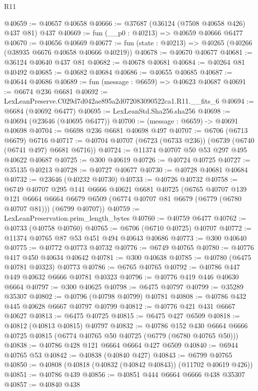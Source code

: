\begin{lexlean}{R11}
\begin{coremodule}
@40659 := @40657 @40658
@40666 := @37687 (@36124 (@7508 @40658 @426) @437 @81) @437
@40669 := fun (__p0 : @40213) => @40659 @40666 @6477
@40670 := @40656 @40669
@40677 := fun (state : @40213) => @40265 (@40266 (@38935 @6676 @40658 @40666 @40219))
@40678 := @40670 @40677
@40681 := @36124 @40640 @437 @81
@40682 := @40678 @40681
@40684 := @40264 @81 @40492
@40685 := @40682 @40684
@40686 := @40655 @40685
@40687 := @40644 @40686
@40689 := fun (message : @6659) => @40623 @40687
@40691 := @6674 @236 @6681
@40692 := LexLeanPreserve.C029d7d042ae895a2d072083090522ca1.R11.__fits_6
@40694 := @6684 (@40692 @6477)
@40695 := LexLeanStd.Sha256.sha256
@40698 := @40694 (@23646 (@40695 @6477))
@40700 := (message : @6659) -> @40691 @40698
@40704 := @6698 @236 @6681 @40698 @497
@40707 := @6706 (@6713 @6679) @6716
@40717 := @40704 @40707 (@6723 (@6733 @236)) (@6739 (@6740 (@6741 @497) @6681 @6716))
@40724 := @11374 @40707 @50 @53 @297 @495 @40622 @40687
@40725 := @300 @40619
@40726 := @40724 @40725
@40727 := @35135 @40213
@40728 := @40727 @40677
@40730 := @40728 @40681 @40684
@40732 := @23646 (@40232 @40730)
@40733 := @40726 @40732
@40758 := @6749
    @40707
    @295
    @141
    @6666
    @40621
    @6681
    @40725
    (@6765
      @40707
      @139
      @121
      @6664
      @6664
      @6679
      @6509
      (@6774 @40707 @81 @6679 (@6779 (@6780 @40707 @81)))
      (@6799 @40707))
@40759 := LexLeanPreservation.prim_length_bytes
@40760 := @40759 @6477
@40762 := @40733 (@40758 @40760)
@40765 := @6706 (@6710 @40725) @40707
@40772 := @11374 @40765 @87 @53 @451 @494 @40643 @40686
@40773 := @300 @40640
@40775 := @40772 @40773 @40732
@40776 := @6749 @40765
@40780 := @40776 @417 @450 @40634 @40642
@40781 := @300 @40638
@40785 := @40780 (@6475 @40781 @40323) @40773
@40786 := @6765 @40765
@40792 := @40786 @447 @449 @40632 @6666 @40781 @40323
@40796 := @40776 @419 @446 @40630 @6664
@40797 := @300 @40625
@40798 := @6475 @40797
@40799 := @35289 @35307
@40802 := @40796 (@40798 @40799) @40781
@40808 := @40786 @432 @445 @40628 @6667 @40797 @40799
@40812 := @40776 @421 @431 @6667 @40627
@40813 := @6475 @40725
@40815 := @6475 @427 @6509
@40818 := @40812 (@40813 @40815) @40797
@40832 := @40786
    @152
    @430
    @6664
    @6666
    @40725
    @40815
    (@6774 @40765 @50 @40725 (@6779 (@6780 @40765 @50)))
@40838 := @40786 @428 @121 @6664 @6664 @427 @6509
@40840 := @6944 @40765 @53
@40842 := @40838 (@40840 @427)
@40843 := @6799 @40765
@40850 := @40808 (@40818 (@40832 (@40842 @40843)) (@11702 @40619 @426))
@40851 := @40786 @439
@40856 := @40851 @444 @6664 @6666 @438 @35307
@40857 := @40840 @438

\end{coremodule}
\end{lexlean}
